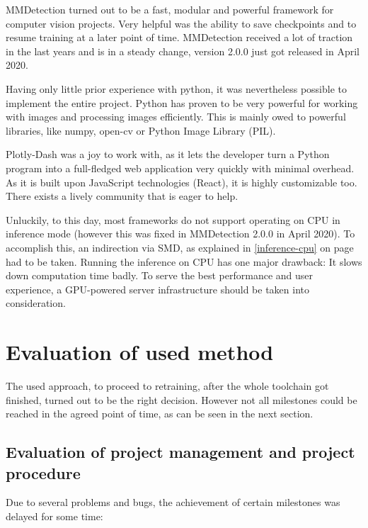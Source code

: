 MMDetection turned out to be a fast, modular and powerful framework for computer vision projects. Very helpful was the ability to save checkpoints and to resume training at a later point of time. MMDetection received a lot of traction in the last years and is in a steady change, version 2.0.0 just got released in April 2020.

Having only little prior experience with python, it was nevertheless possible to implement the entire project. Python has proven to be very powerful for working with images and processing images efficiently. This is mainly owed to powerful libraries, like numpy, open-cv or Python Image Library (PIL).

Plotly-Dash was a joy to work with, as it lets the developer turn a Python program into a full-fledged web application very quickly with minimal overhead. As it is built upon JavaScript technologies (React), it is highly customizable too. There exists a lively community that is eager to help.

Unluckily, to this day, most frameworks do not support operating on CPU in inference mode (however this was fixed in MMDetection 2.0.0 in April 2020). To accomplish this, an indirection via SMD, as explained in \ref{inference-cpu} on page \pageref{inference-cpu} had to be taken. Running the inference on CPU has one major drawback: It slows down computation time badly. To serve the best performance and user experience, a GPU-powered server infrastructure should be taken into consideration.

\section{Evaluation of used method}

The used approach, to proceed to retraining, after the whole toolchain got finished, turned out to be the right decision. However not all milestones could be reached in the agreed point of time, as can be seen in the next section.

\subsection{Evaluation of project management and project procedure}

Due to several problems and bugs, the achievement of certain milestones was delayed for some time:

